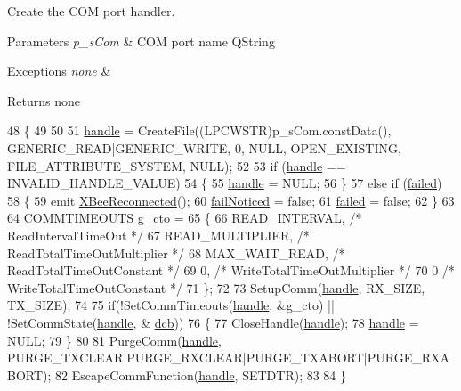 Create the C\-O\-M port handler. 


\begin{DoxyParams}{Parameters}
{\em p\-\_\-s\-Com} & C\-O\-M port name Q\-String \\
\hline
\end{DoxyParams}

\begin{DoxyExceptions}{Exceptions}
{\em none} & \\
\hline
\end{DoxyExceptions}
\begin{DoxyReturn}{Returns}
none 
\end{DoxyReturn}

\begin{DoxyCode}
48 \{
49 
50 
51     \hyperlink{a00002_a07ff1fa563f3d58110ce80c3c1796f9b}{handle} = CreateFile((LPCWSTR)p\_sCom.constData(), GENERIC\_READ|GENERIC\_WRITE, 0, NULL, 
      OPEN\_EXISTING, FILE\_ATTRIBUTE\_SYSTEM, NULL);
52 
53     \textcolor{keywordflow}{if} (\hyperlink{a00002_a07ff1fa563f3d58110ce80c3c1796f9b}{handle} == INVALID\_HANDLE\_VALUE)
54     \{
55         \hyperlink{a00002_a07ff1fa563f3d58110ce80c3c1796f9b}{handle} = NULL;
56     \}
57     \textcolor{keywordflow}{else} \textcolor{keywordflow}{if} (\hyperlink{a00002_a53794d9466be19cb9c0b65f87090e237}{failed})
58     \{
59         emit \hyperlink{a00002_afb47495b5727dae0e7a5bac62098cb1e}{XBeeReconnected}();
60         \hyperlink{a00002_a8e19c465f25509158341edd459c119b1}{failNoticed} = \textcolor{keyword}{false};
61         \hyperlink{a00002_a53794d9466be19cb9c0b65f87090e237}{failed} = \textcolor{keyword}{false};
62     \}
63 
64     COMMTIMEOUTS g\_cto =
65     \{
66         READ\_INTERVAL,      \textcolor{comment}{/* ReadIntervalTimeOut          */}
67         READ\_MULTIPLIER,    \textcolor{comment}{/* ReadTotalTimeOutMultiplier   */}
68         MAX\_WAIT\_READ,      \textcolor{comment}{/* ReadTotalTimeOutConstant     */}
69         0,                  \textcolor{comment}{/* WriteTotalTimeOutMultiplier  */}
70         0                   \textcolor{comment}{/* WriteTotalTimeOutConstant    */}
71     \};
72 
73     SetupComm(\hyperlink{a00002_a07ff1fa563f3d58110ce80c3c1796f9b}{handle}, RX\_SIZE, TX\_SIZE);
74 
75     \textcolor{keywordflow}{if}(!SetCommTimeouts(\hyperlink{a00002_a07ff1fa563f3d58110ce80c3c1796f9b}{handle}, &g\_cto) || !SetCommState(\hyperlink{a00002_a07ff1fa563f3d58110ce80c3c1796f9b}{handle}, &
      \hyperlink{a00002_a9954a8d34e6014302ae1d99cf5714cc9}{dcb}))
76     \{
77         CloseHandle(\hyperlink{a00002_a07ff1fa563f3d58110ce80c3c1796f9b}{handle});
78         \hyperlink{a00002_a07ff1fa563f3d58110ce80c3c1796f9b}{handle} = NULL;
79     \}
80 
81     PurgeComm(\hyperlink{a00002_a07ff1fa563f3d58110ce80c3c1796f9b}{handle}, PURGE\_TXCLEAR|PURGE\_RXCLEAR|PURGE\_TXABORT|PURGE\_RXABORT);
82     EscapeCommFunction(\hyperlink{a00002_a07ff1fa563f3d58110ce80c3c1796f9b}{handle}, SETDTR);
83 
84 \}
\end{DoxyCode}
